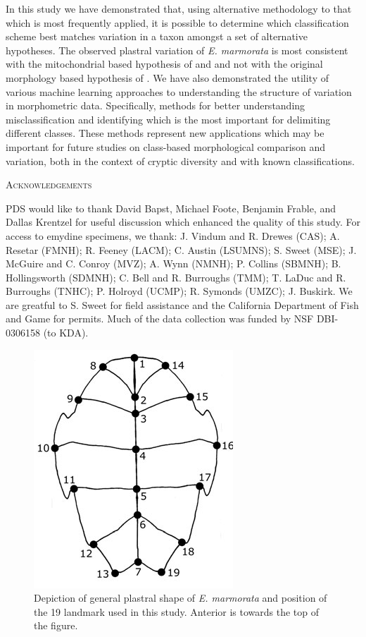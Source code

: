 \documentclass[12pt,letterpaper]{article}\usepackage{graphicx, color}
\renewcommand{\section}[1]{%
\bigskip
\begin{center}
\begin{Large}
\normalfont\scshape #1
\medskip
\end{Large}
\end{center}}
\begin{document}
In this study we have demonstrated that, using alternative methodology to that which is most frequently applied, it is possible to determine which classification scheme best matches variation in a taxon amongst a set of alternative hypotheses. The observed plastral variation of \textit{E. marmorata} is most consistent with the mitochondrial based hypothesis of \citet{Spinks2005} and \citet{Spinks2010} and not with the original morphology based hypothesis of \citet{Seeliger1945,Holland1992}. We have also demonstrated the utility of various machine learning approaches to understanding the structure of variation in morphometric data. Specifically, methods for better understanding misclassification and identifying which is the most important for delimiting different classes. These methods represent new applications which may be important for future studies on class-based morphological comparison and variation, both in the context of cryptic diversity and with known classifications.

\section{Acknowledgements}
PDS would like to thank David Bapst, Michael Foote, Benjamin Frable, and Dallas Krentzel for useful discussion which enhanced the quality of this study. For access to emydine specimens, we thank: J. Vindum and R. Drewes (CAS); A. Resetar (FMNH); R. Feeney (LACM); C. Austin (LSUMNS); S. Sweet (MSE); J. McGuire and C. Conroy (MVZ); A. Wynn (NMNH); P. Collins (SBMNH); B. Hollingsworth (SDMNH); C. Bell and R. Burroughs (TMM); T. LaDuc and R. Burroughs (TNHC); P. Holroyd (UCMP); R. Symonds (UMZC); J. Buskirk. We are greatful to S. Sweet for field assistance and the California Department of Fish and Game for permits. Much of the data collection was funded by NSF DBI-0306158 (to KDA).




\pagebreak

\begin{figure}[ht]
  \centering
  \includegraphics{figure/plastra}
  \caption{Depiction of general plastral shape of \textit{E. marmorata} and position of the 19 landmark used in this study. Anterior is towards the top of the figure.}
  \label{fig:plastra}
\end{figure}
\end{document}
